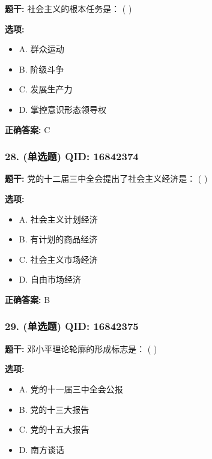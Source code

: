 \documentclass[12pt,UTF8]{ctexart}
\begin{document}
\textbf{题干:}
社会主义的根本任务是： ( )

\textbf{选项:}
\begin{itemize}[leftmargin=*]

  \item A. 群众运动

  \item B. 阶级斗争

  \item C. 发展生产力

  \item D. 掌控意识形态领导权

\end{itemize}

\textbf{正确答案:}
C

\vspace{0.3em}\hrulefill\vspace{0.7em}

\subsubsection*{28. (单选题) \small QID: 16842374}

\textbf{题干:}
党的十二届三中全会提出了社会主义经济是： ( )

\textbf{选项:}
\begin{itemize}[leftmargin=*]

  \item A. 社会主义计划经济

  \item B. 有计划的商品经济

  \item C. 社会主义市场经济

  \item D. 自由市场经济

\end{itemize}

\textbf{正确答案:}
B

\vspace{0.3em}\hrulefill\vspace{0.7em}

\subsubsection*{29. (单选题) \small QID: 16842375}

\textbf{题干:}
邓小平理论轮廓的形成标志是： ( )

\textbf{选项:}
\begin{itemize}[leftmargin=*]

  \item A. 党的十一届三中全会公报

  \item B. 党的十三大报告

  \item C. 党的十五大报告

  \item D. 南方谈话

\end{itemize}
\end{document}
